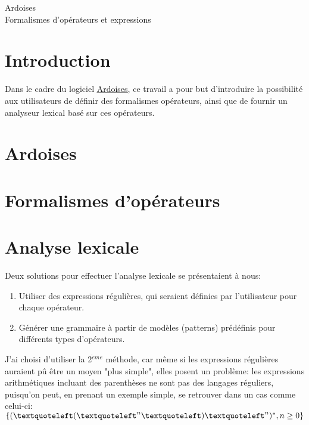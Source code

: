 \documentclass{article}
\begin{document}
\begin{center}
	\huge 
	Ardoises \\
	Formalismes d'opérateurs et expressions
\end{center}
\renewcommand{\contentsname}{Sommaire}
\tableofcontents
\newpage

\section{Introduction}
Dans le cadre du logiciel \underline{\href{https://ardoises.ovh/overview}{Ardoises}}, ce travail a pour but d'introduire la possibilité aux utilisateurs de définir des formalismes opérateurs, ainsi que de fournir un analyseur lexical basé sur ces opérateurs. 
\section{Ardoises}
\section{Formalismes d'opérateurs}
\section{Analyse lexicale}
Deux solutions pour effectuer l'analyse lexicale se présentaient à nous:
\begin{enumerate}
	\item Utiliser des expressions régulières, qui seraient définies par l'utilisateur pour chaque opérateur.
	\item Générer une grammaire à partir de modèles (patterns) prédéfinis pour différents types d'opérateurs.
\end{enumerate}
J'ai choisi d'utiliser la 2$^{\grave{e}me}$ méthode, car même si les expressions régulières auraient pû être un moyen "plus simple", elles posent un problème: les expressions arithmétiques incluant des parenthèses ne sont pas des langages réguliers, puisqu'on peut, en prenant un exemple simple, se retrouver dans un cas comme celui-ci: $\{(\textquoteleft(\textquoteleft^{n}\textquoteleft)\textquoteleft^{n})^{*}, n \ge 0 \}$
\end{document}
